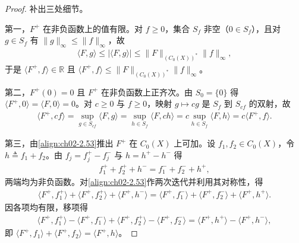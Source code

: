 \documentclass[../../main.tex]{subfiles}%
\begin{document}
\begin{proof}
补出三处细节。

第一，$F^+$ 在非负函数上的值有限。对 $f\geqslant0$，集合 $S_f$ 非空（$0\in S_f$），且对 $g\in S_f$ 有 $\|g\|_\infty\leqslant\|f\|_\infty$，故
\begin{align*}
\langle F,g\rangle\leqslant|\langle F,g\rangle|\leqslant\|F\|_{(C_0(X))^*}\|f\|_\infty,
\end{align*}
于是 $\langle F^+,f\rangle\in\mathbb R$ 且 $\langle F^+,f\rangle\leqslant\|F\|_{(C_0(X))^*}\|f\|_\infty$。

第二，$F^+(0)=0$ 且 $F^+$ 在非负函数上正齐次。由 $S_0=\{0\}$ 得 $\langle F^+,0\rangle=\langle F,0\rangle=0$。对 $c\geqslant0$ 与 $f\geqslant0$，映射 $g\mapsto cg$ 是 $S_f$ 到 $S_{cf}$ 的双射，故
\begin{align*}
\langle F^+,cf\rangle=\sup_{g\in S_{cf}}\langle F,g\rangle=\sup_{h\in S_f}\langle F,ch\rangle=c\sup_{h\in S_f}\langle F,h\rangle=c\langle F^+,f\rangle.
\end{align*}

第三，由\eqref{align:ch02-2.53}推出 $F^+$ 在 $C_0(X)$ 上可加。设 $f_1,f_2\in C_0(X)$，令 $h\triangleq f_1+f_2$。由 $f_j=f_j^+-f_j^-$ 与 $h=h^+-h^-$ 得
\begin{align*}
f_1^++f_2^++h^-=f_1^-+f_2^-+h^+,
\end{align*}
两端均为非负函数。对\eqref{align:ch02-2.53}作两次迭代并利用其对称性，得
\begin{align*}
\langle F^+,f_1^+\rangle+\langle F^+,f_2^+\rangle+\langle F^+,h^-\rangle
=\langle F^+,f_1^-\rangle+\langle F^+,f_2^-\rangle+\langle F^+,h^+\rangle.
\end{align*}
因各项均有限，移项得
\begin{align*}
\langle F^+,f_1^+\rangle-\langle F^+,f_1^-\rangle+\langle F^+,f_2^+\rangle-\langle F^+,f_2^-\rangle
=\langle F^+,h^+\rangle-\langle F^+,h^-\rangle,
\end{align*}
即 $\langle F^+,f_1\rangle+\langle F^+,f_2\rangle=\langle F^+,h\rangle$。
\end{proof}
\end{document}

